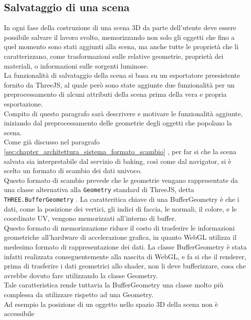 \subsection{Salvataggio di una scena}
\label{sec:chapter_creazione_scena_funzionalita_editor_salvataggio_scena}
In ogni fase della costruzione di una scena 3D da parte dell’utente deve essere possibile salvare il lavoro svolto, memorizzando non solo gli oggetti che fino a quel momento sono stati aggiunti alla scena, ma anche tutte le proprietà che li caratterizzano, come trasformazioni sulle relative geometrie, proprietà dei materiali, o informazioni sulle sorgenti luminose. 
\\
La funzionalità di salvataggio della scena si basa su un esportatore preesistente fornito da ThreeJS, al quale però sono state aggiunte due funzionalità per un preprocessamento di alcuni attributi della scena prima della vera e propria esportazione.
\\
Compito di questo paragrafo sarà descrivere e motivare le funzionalità aggiunte, iniziando dal preprocessamento delle geometrie degli oggetti che popolano la scena.
\\
Come già discusso nel paragrafo \ref{sec:chapter_architettura_sistema_formato_scambio} , per far si che la scena salvata sia interpretabile dal servizio di baking, così come dal navigator, si è scelto un formato di scambio dei dati univoco.
\\ 
Questo formato di scambio prevede che le geometrie vengano rappresentate da una classe alternativa alla \texttt{Geometry} standard di ThreeJS, detta \texttt{THREE.BufferGeometry} .
La caratteritica chiave di una BufferGeometry è che i dati, come la posizione dei vertici, gli indici di faccia, le normali, il colore, e le coordinate UV, vengono memorizzati all’interno di buffer. 
\\
Questo formato di memorizzazione riduce il costo di trasferire le informazioni geometriche all’hardware di accelerazione grafica, in quanto WebGL utilizza il medesimo formato di rappresentazione dei dati. La classe BufferGeometry è stata infatti realizzata conseguentemente alla nascita di WebGL, e fa si che il renderer, prima di trasferire i dati geometrici allo shader, non li deve bufferizzare, cosa che avrebbe dovuto fare utilizzando la classe Geometry.
\\
Tale caratteristica rende tuttavia la BufferGeometry una classe molto più complessa da utilizzare rispetto ad una Geometry.
\\
Ad esempio la posizione di un oggetto nello spazio 3D della scena non è accessibile
